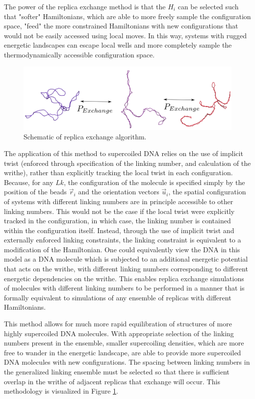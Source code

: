 \documentclass[english]{article}
\begin{document}
The power of the replica exchange method is that the $H_i$ can be selected such that "softer" Hamiltonians, which are able to more freely sample the configuration space, "feed" the more constrained Hamiltonians with new configurations that would not be easily accessed using local moves. In this way, systems with rugged energetic landscapes can escape local wells and more completely sample the thermodynamically accessible configuration space.

\begin{figure}
\centering
\includegraphics[scale=0.4]{figures/ReplicaExchange.png}
\caption{Schematic of replica exchange algorithm.}
\label{figure7}
\end{figure}

The application of this method to supercoiled DNA relies on the use of implicit twist (enforced through specification of the linking number, and calculation of the writhe), rather than explicitly tracking the local twist in each configuration. Because, for any $Lk$, the configuration of the molecule is specified simply by the position of the beads $\vec{r}_i$ and the orientation vectors $\vec{u}_i$, the spatial configuration of systems with different linking numbers are in principle accessible to other linking numbers. This would not be the case if the local twist were explicitly tracked in the configuration, in which case, the linking number is contained within the configuration itself. Instead, through the use of implicit twist and externally enforced linking constraints, the linking constraint is equivalent to a modification of the Hamiltonian. One could equivalently view the DNA in this model as a DNA molecule which is subjected to an additional energetic potential that acts on the writhe, with different linking numbers corresponding to different energetic dependencies on the writhe. This enables replica exchange simulations of molecules with different linking numbers to be performed in a manner that is formally equivalent to simulations of any ensemble of replicas with different Hamiltonians.

This method allows for much more rapid equilibration of structures of more highly supercoiled DNA molecules. With appropriate selection of the linking numbers present in the ensemble, smaller supercoiling densities, which are more free to wander in the energetic landscape, are able to provide more supercoiled DNA molecules with new configurations. The spacing between linking numbers in the generalized linking ensemble must be selected so that there is sufficient overlap in the writhe of adjacent replicas that exchange will occur. This methodology is visualized in Figure \ref{figure7}.
\end{document}
